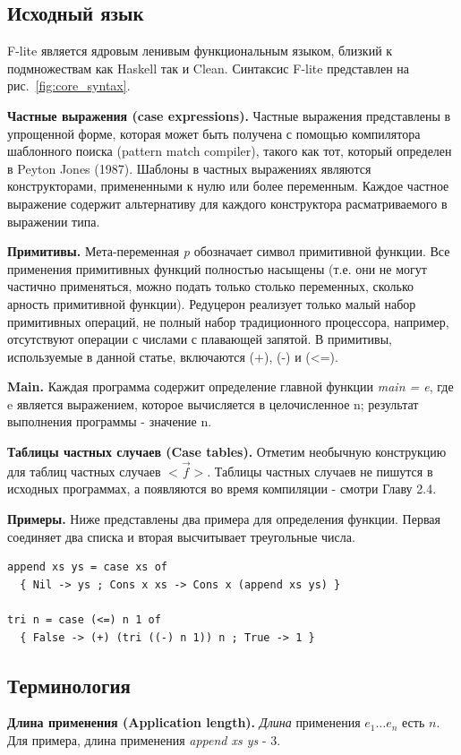 \documentclass[14pt]{extarticle}
\begin{document}
\subsection{Исходный язык}
F-lite является ядровым ленивым функциональным языком, близкий к подмножествам как Haskell так и Clean. Синтаксис F-lite представлен на рис.~\ref{fig:core_syntax}.

\textbf{Частные выражения (case expressions).} Частные выражения представлены в упрощенной форме, которая может быть получена с помощью компилятора шаблонного поиска (pattern match compiler), такого как тот, который определен в Peyton Jones (1987). Шаблоны в частных выражениях являются конструкторами, примененными к нулю или более переменным. Каждое частное выражение содержит альтернативу для каждого конструктора расматриваемого в выражении типа.

\textbf{Примитивы.} Мета-переменная \textit{p} обозначает символ примитивной функции. Все применения примитивных функций полностью насыщены (т.е. они не могут частично применяться, можно подать только столько переменных, сколько арность примитивной функции). Редуцерон реализует только малый набор примитивных операций, не полный набор традиционного процессора, например, отсутствуют операции с числами с плавающей запятой. В примитивы, используемые в данной статье, включаются (+), (-) и (<=).

\textbf{Main.} Каждая программа содержит определение главной функции \textit{main = e}, где e является выражением, которое вычисляется в целочисленное n; результат выполнения программы - значение n.

\textbf{Таблицы частных случаев (Case tables).} Отметим необычную конструкцию для таблиц частных случаев $<\overrightarrow{f}>$. Таблицы частных случаев не пишутся в исходных программах, а появляются во время компиляции - смотри Главу 2.4.

\textbf{Примеры.} Ниже представлены два примера для определения функции. Первая соединяет два списка и вторая высчитывает треугольные числа.

\begin{verbatim}
append xs ys = case xs of
  { Nil -> ys ; Cons x xs -> Cons x (append xs ys) }
  
tri n = case (<=) n 1 of
  { False -> (+) (tri ((-) n 1)) n ; True -> 1 }
\end{verbatim}

\subsection{Терминология}
\textbf{Длина применения (Application length).} \textit{Длина} применения $e_1 \ldots e_n$ есть $n$. Для примера, длина применения \textit{append xs ys} - 3.
\end{document}
